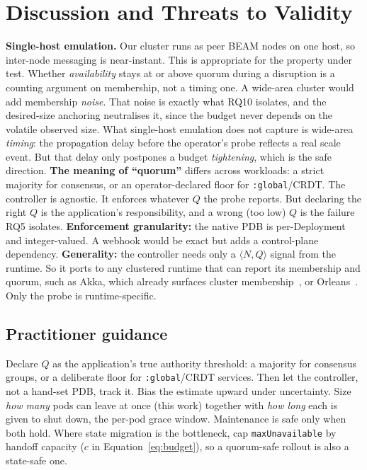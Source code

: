 \documentclass[AMA,Times1COL]{WileyNJDv5}
\begin{document}
\section{Discussion and Threats to Validity}\label{sec:discuss}
\textbf{Single-host emulation.} Our cluster runs as peer BEAM nodes on one host, so inter-node messaging
is near-instant. This is appropriate for the property under test. Whether \emph{availability} stays at or
above quorum during a disruption is a counting argument on membership, not a timing one. A wide-area
cluster would add membership \emph{noise}. That noise is exactly what RQ10 isolates, and the desired-size
anchoring neutralises it, since the budget never depends on the volatile observed size. What single-host
emulation does not capture is wide-area \emph{timing}: the propagation delay before the operator's probe
reflects a real scale event. But that delay only postpones a budget \emph{tightening}, which is the safe
direction. \textbf{The meaning of ``quorum''} differs across workloads: a strict majority for consensus,
or an operator-declared floor for \texttt{:global}/CRDT. The controller is agnostic. It enforces whatever
$Q$ the probe reports. But declaring the right $Q$ is the application's responsibility, and a wrong (too
low) $Q$ is the failure RQ5 isolates. \textbf{Enforcement granularity:} the native PDB is per-Deployment
and integer-valued. A webhook would be exact but adds a control-plane dependency. \textbf{Generality:}
the controller needs only a $\langle N, Q\rangle$ signal from the runtime. So it ports to any clustered
runtime that can report its membership and quorum, such as Akka, which already surfaces cluster
membership~\cite{akkaHealth}, or Orleans~\cite{orleans}. Only the probe is runtime-specific.

\subsection{Practitioner guidance}\label{sec:guidance}
Declare $Q$ as the application's true authority threshold: a majority for consensus groups, or a
deliberate floor for \texttt{:global}/CRDT services. Then let the controller, not a hand-set PDB, track
it. Bias the estimate upward under uncertainty. Size \emph{how many} pods can leave at once (this work)
together with \emph{how long} each is given to shut down, the per-pod grace window. Maintenance is safe
only when both hold. Where state migration is the bottleneck, cap \texttt{maxUnavailable} by handoff
capacity ($c$ in Equation~\eqref{eq:budget}), so a quorum-safe rollout is also a state-safe one.
\end{document}
